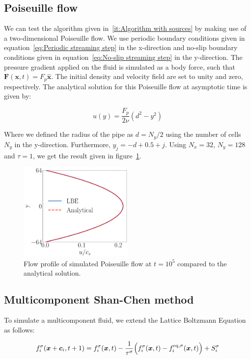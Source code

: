 \subsection{Poiseuille flow}
We can test the algorithm given in~\ref{it:Algorithm with sources} by making use of a two-dimensional Poiseuille flow. We use periodic boundary conditions given in equation~\ref{eq:Periodic streaming step} in the x-direction and no-slip boundary conditions given in equation~\ref{eq:No-slip streaming step} in the y-direction. The pressure gradient applied on the fluid is simulated as a body force, such that $\bm{F}(\bm{x}, t) = F_p \hat{\bm{x}}$. The initial density and velocity field are set to unity and zero, respectively. The analytical solution for this Poiseuille flow at asymptotic time is given by:

\begin{equation}
    u(y) = \frac{F_p}{2 \nu} \left( d^2 - y^2 \right)
\end{equation}

Where we defined the radius of the pipe as $d = N_y/2$ using the number of cells $N_y$ in the y-direction. Furthermore, $y_j = -d + 0.5 + j$. Using $N_x = 32$, $N_y = 128$ and $\tau = 1$, we get the result given in figure~\ref{fig:poiseuille}.

\begin{figure}[htp]
    \centering
    \includegraphics[width=0.5\textwidth]{figures/poiseuille.pdf}
    \caption{Flow profile of simulated Poiseuille flow at $t=10^5$ compared to the analytical solution.}\label{fig:poiseuille}
\end{figure}

\subsection{Multicomponent Shan-Chen method}
To simulate a multicomponent fluid, we extend the Lattice Boltzmann Equation as follows:

\begin{equation}\label{eq:Lattice Boltzmann Equation multicomponent}
    f_i^{\sigma}(\bm{x} + \bm{c}_i, t + 1) = f_i^{\sigma}(\bm{x}, t) - \frac{1}{\tau^{\sigma}}\Bigl(f_i^{\sigma}(\bm{x}, t) - f_i^{\text{eq}, \sigma}(\bm{x}, t)\Bigr) + S_i^{\sigma} 
\end{equation}

